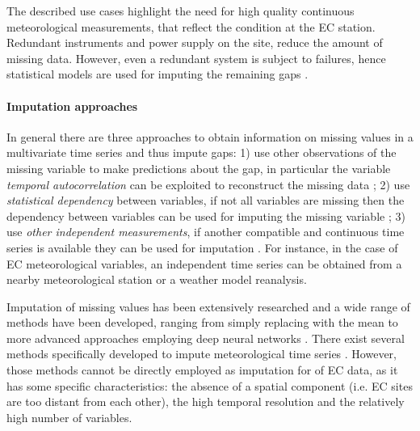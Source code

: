 \documentclass{article}
\begin{document}
The described use cases highlight the need for high quality continuous meteorological measurements, that reflect the condition at the EC station. Redundant instruments and power supply on the site, reduce the amount of missing data. However, even a redundant system is subject to failures, hence statistical models are used for imputing the remaining gaps \cite{aubinet_eddy_2012-1}.

\paragraph{Imputation approaches} In general there are three approaches to obtain information on missing values in a multivariate time series and thus impute gaps:
1) use other observations of the missing variable to make predictions about the gap, in particular the variable \emph{temporal autocorrelation} can be exploited to reconstruct the missing data \cite{moritz_comparison_nodate};
2) use \emph{statistical dependency} between variables, if not all variables are missing then the dependency between variables can be used for imputing the missing variable \cite{moffat_comprehensive_2007};
3) use \emph{other independent measurements}, if another compatible and continuous time series is available they can be used for imputation \cite{vuichard_filling_2015}. For instance, in the case of EC meteorological variables, an independent time series can be obtained from a nearby meteorological station or a weather model reanalysis. 

Imputation of missing values has been extensively researched and a wide range of methods have been developed, ranging from simply replacing with the mean to more advanced approaches employing deep neural networks \cite{moritz_r_2017, fang_time_2020-1, buuren_mice_2011, du_saits_2022-1, zhang_dual-head_2021-2, cao_brits_nodate}. There exist several methods specifically developed to impute meteorological time series \cite{costa_gap_2021, jing_multi-imputation_2022}. However, those methods cannot be directly employed as imputation for of EC data, as it has some specific characteristics: the absence of a spatial component (i.e. EC sites are too distant from each other), the high temporal resolution and the relatively high number of variables. 
\end{document}
